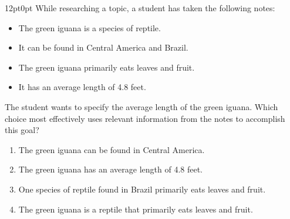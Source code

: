 \documentclass[11pt, twocolumn]{article}
\newcounter{questionnum}
\begin{document}
\vspace{6pt}\noindent
\begin{minipage}{\columnwidth}\raggedright
\noindent{}\par\vspace{8pt}
\begin{adjustwidth}{12pt}{0pt}
While researching a topic, a student has taken the following notes:

\begin{itemize}

\item The green iguana is a species of reptile.

\item It can be found in Central America and Brazil.

\item The green iguana primarily eats leaves and fruit.

\item It has an average length of 4.8 feet.

\end{itemize}
\vspace{6pt}

The student wants to specify the average length of the green iguana. Which choice most effectively uses relevant information from the notes to accomplish this goal?
\begin{enumerate}[label=\Alph*),leftmargin=18pt,topsep=3pt,itemsep=2pt]
  \item The green iguana can be found in Central America.
  \item The green iguana has an average length of 4.8 feet.
  \item One species of reptile found in Brazil primarily eats leaves and fruit.
  \item The green iguana is a reptile that primarily eats leaves and fruit.
\end{enumerate}
\end{adjustwidth}
\end{minipage}\par
\end{document}
